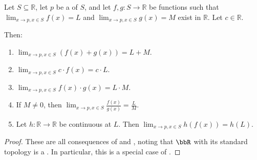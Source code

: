 \begin{proposition} \label{proposition:limits_of_functions_from_topological_spaces_to_real_number_field_at_accumulation_points_are_preserved_under_arithmetic_and_scalar_multiplication}
    Let $S \subseteq \mathbb{R}$, let $p$ be a  of $S$, and let $f, g : S \to \mathbb{R}$ be functions such that $\lim_{x \to p, x \in S} f(x) = L$ and $\lim_{x \to p, x \in S} g(x) = M$ exist in $\mathbb{R}$. Let $c \in \mathbb{R}$.

    Then:
    \begin{enumerate}
        \item[$($sum$)$] $\lim_{x \to p, x \in S} (f(x) + g(x)) = L + M$.
        \item[$($scalar$)$] $\lim_{x \to p, x \in S} c \cdot f(x) = c \cdot L$.
        \item[$($product$)$] $\lim_{x \to p, x \in S} f(x) \cdot g(x) = L \cdot M$.
        \item[$($quotient$)$] If $M \neq 0$, then $\lim_{x \to p, x \in S} \frac{f(x)}{g(x)} = \frac{L}{M}$.
        \item[$($composition$)$] Let $h : \mathbb{R} \to \mathbb{R}$ be continuous at $L$. 
        Then $\lim_{x \to p, x \in S} h(f(x)) = h(L)$.
    \end{enumerate}
\end{proposition}

\begin{proof}
    These are all consequences of  and , noting that $\bbR$ with its standard topology is a . In particular, this is a special case of .
\end{proof}